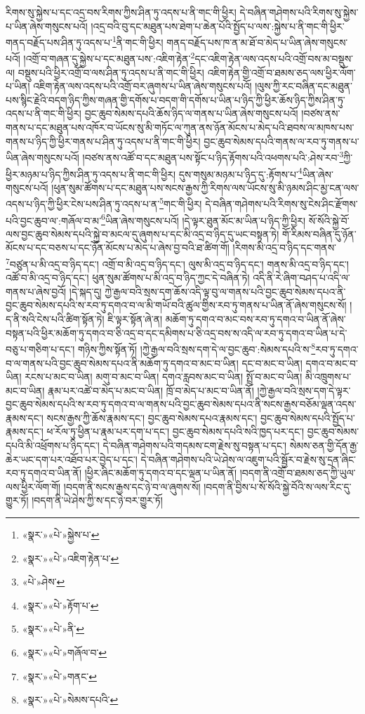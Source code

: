 རིགས་སུ་སྐྱེས་པ་དང་འདྲ་བས་རིགས་ཀྱིས་ཤིན་ཏུ་འདས་པ་ནི་གང་གི་ཕྱིར། དེ་བཞིན་གཤེགས་པའི་རིགས་སུ་སྐྱེས་པ་ཡིན་ཞེས་གསུངས་པའོ། །འདྲ་བའི་བུ་དང་མཐུན་པས་ཐེག་པ་ཆེན་པོའི་སྤྱོད་པ་ལས་:སྐྱེས་པ་ནི་གང་གི་ཕྱིར་གནད་བརྗོད་པས་ཤིན་ཏུ་འདས་པ་\footnote{«སྣར་»«པེ་»སྐྱེས་པ་}ནི་གང་གི་ཕྱིར། གནད་བརྗོད་པས་ཁ་ན་མ་ཐོ་བ་མེད་པ་ཡིན་ཞེས་གསུངས་པའོ། །འགྲོ་བ་གཞན་དུ་སྐྱེས་པ་དང་མཐུན་པས་:འཇིག་རྟེན་\footnote{«སྣར་»«པེ་»འཇིག་རྟེན་པ་}དང་འཇིག་རྟེན་ལས་འདས་པའི་འགྲོ་བས་མ་བསྡུས་ལ། བསྡུས་པའི་ཕྱིར་འགྲོ་བ་ལས་ཤིན་ཏུ་འདས་པ་ནི་གང་གི་ཕྱིར། འཇིག་རྟེན་གྱི་འགྲོ་བ་ཐམས་ཅད་ལས་ཕྱིར་ལོག་པ་ཡིན། འཇིག་རྟེན་ལས་འདས་པའི་འགྲོ་བར་ཞུགས་པ་ཡིན་ཞེས་གསུངས་པའོ། །ལུས་ཀྱི་རང་བཞིན་དང་མཐུན་པས་སྙིང་རྗེའི་བདག་ཉིད་ཀྱིས་གཞན་གྱི་དགོས་པ་བདག་གི་དགོས་པ་ཡིན་པ་ཉིད་ཀྱི་ཕྱིར་ཆོས་ཉིད་ཀྱིས་ཤིན་ཏུ་འདས་པ་ནི་གང་གི་ཕྱིར། བྱང་ཆུབ་སེམས་དཔའི་ཆོས་ཉིད་ལ་གནས་པ་ཡིན་ཞེས་གསུངས་པའོ། །བཙས་ནས་གནས་པ་དང་མཐུན་པས་འཁོར་བ་ཡོངས་སུ་མི་གཏོང་ལ་ཀུན་ནས་ཉོན་མོངས་པ་མེད་པའི་ཐབས་ལ་མཁས་པས་གནས་པ་ཉིད་ཀྱི་ཕྱིར་གནས་པ་ཤིན་ཏུ་འདས་པ་ནི་གང་གི་ཕྱིར། བྱང་ཆུབ་སེམས་དཔའི་གནས་ལ་རབ་ཏུ་གནས་པ་ཡིན་ཞེས་གསུངས་པའོ། །བཙས་ནས་འཚོ་བ་དང་མཐུན་པས་སྟོང་པ་ཉིད་རྟོགས་པའི་འཕགས་པའི་:ཤེས་རབ་\footnote{«པེ་»ཤེས་}ཀྱི་ཕྱིར་མཉམ་པ་ཉིད་ཀྱིས་ཤིན་ཏུ་འདས་པ་ནི་གང་གི་ཕྱིར། དུས་གསུམ་མཉམ་པ་ཉིད་དུ་:རྟོགས་པ་\footnote{«སྣར་»«པེ་»རྟོག་པ་}ཡིན་ཞེས་གསུངས་པའོ། །ཕུན་སུམ་ཚོགས་པ་དང་མཐུན་པས་སངས་རྒྱས་ཀྱི་རིགས་ལས་ཡོངས་སུ་མི་ཉམས་ཤིང་མྱ་ངན་ལས་འདས་པ་ཉིད་ཀྱི་ཕྱིར་ངེས་པས་ཤིན་ཏུ་འདས་པ་ན་\footnote{«སྣར་»«པེ་»ནི་}གང་གི་ཕྱིར། དེ་བཞིན་གཤེགས་པའི་རིགས་སུ་ངེས་ཤིང་རྫོགས་པའི་བྱང་ཆུབ་ལ་:གཞོལ་བ་མ་\footnote{«སྣར་»«པེ་»གཞོལ་བ་}ཡིན་ཞེས་གསུངས་པའོ། །དེ་ལྟར་ཐུན་མོང་མ་ཡིན་པ་ཉིད་ཀྱི་ཕྱིར། སོ་སོའི་སྐྱེ་བོ་ལས་བྱང་ཆུབ་སེམས་དཔའི་སྐྱེ་བ་མངལ་དུ་ཞུགས་པ་དང་མི་འདྲ་བ་ཉིད་དུ་ཡང་བསྟན་ཏེ། གོ་རིམས་བཞིན་དུ་ཉོན་མོངས་པ་དང་བཅས་པ་དང་ཉོན་མོངས་པ་མེད་པ་ཞེས་བྱ་བའི་ཐ་ཚིག་གོ། །རིགས་མི་འདྲ་བ་ཉིད་དང་གནས་\footnote{«སྣར་»«པེ་»གནང་}བཙུན་པ་མི་འདྲ་བ་ཉིད་དང་། འགྲོ་བ་མི་འདྲ་བ་ཉིད་དང་། ལུས་མི་འདྲ་བ་ཉིད་དང་། གནས་མི་འདྲ་བ་ཉིད་དང་། འཚོ་བ་མི་འདྲ་བ་ཉིད་དང་། ཕུན་སུམ་ཚོགས་པ་མི་འདྲ་བ་ཉིད་ཀྱང་དེ་བཞིན་ཏེ། འདི་ནི་རེ་ཞིག་བཤད་པ་འདི་ལ་གནས་པ་ཞེས་བྱའོ། །དེ་སྐད་དུ། ཀྱེ་རྒྱལ་བའི་སྲས་དག་ཆོས་འདི་ལྟ་བུ་ལ་གནས་པའི་བྱང་ཆུབ་སེམས་དཔའ་ནི་བྱང་ཆུབ་སེམས་དཔའི་ས་རབ་ཏུ་དགའ་བ་ལ་མི་གཡོ་བའི་ཚུལ་གྱིས་རབ་ཏུ་གནས་པ་ཡིན་ནོ་ཞེས་གསུངས་སོ། །ད་ནི་སའི་ངེས་པའི་ཚིག་སྟོན་ཏེ། ཇི་ལྟར་སྟོན་ཞེ་ན། མཆོག་ཏུ་དགའ་བ་མང་བས་རབ་ཏུ་དགའ་བ་ཡིན་ནོ་ཞེས་བསྟན་པའི་ཕྱིར་མཆོག་ཏུ་དགའ་བ་ཅི་འདྲ་བ་དང་དམིགས་པ་ཅི་འདྲ་བས་ས་འདི་ལ་རབ་ཏུ་དགའ་བ་ཡིན་པ་དེ་བཅུ་པ་གཅིག་པ་དང་། གཉིས་ཀྱིས་སྟོན་ཏོ། །ཀྱེ་རྒྱལ་བའི་སྲས་དག་དེ་ལ་བྱང་ཆུབ་:སེམས་དཔའི་ས་\footnote{«སྣར་»«པེ་»སེམས་དཔའི་}རབ་ཏུ་དགའ་བ་ལ་གནས་པའི་བྱང་ཆུབ་སེམས་དཔའ་ནི་མཆོག་ཏུ་དགའ་བ་མང་བ་ཡིན། དང་བ་མང་བ་ཡིན། དགའ་བ་མང་བ་ཡིན། རངས་པ་མང་བ་ཡིན། མགུ་བ་མང་བ་ཡིན། དགའ་རླབས་མང་བ་ཡིན། སྤྲོ་བ་མང་བ་ཡིན། མི་འཁྲུགས་པ་མང་བ་ཡིན། རྣམ་པར་འཚེ་བ་མེད་པ་མང་བ་ཡིན། ཁྲོ་བ་མེད་པ་མང་བ་ཡིན་ནོ། །ཀྱེ་རྒྱལ་བའི་སྲས་དག་དེ་ལྟར་བྱང་ཆུབ་སེམས་དཔའི་ས་རབ་ཏུ་དགའ་བ་ལ་གནས་པའི་བྱང་ཆུབ་སེམས་དཔའ་ནི་སངས་རྒྱས་བཅོམ་ལྡན་འདས་རྣམས་དང་། སངས་རྒྱས་ཀྱི་ཆོས་རྣམས་དང་། བྱང་ཆུབ་སེམས་དཔའ་རྣམས་དང་། བྱང་ཆུབ་སེམས་དཔའི་སྤྱོད་པ་རྣམས་དང་། ཕ་རོལ་ཏུ་ཕྱིན་པ་རྣམ་པར་དག་པ་དང་། བྱང་ཆུབ་སེམས་དཔའི་སའི་ཁྱད་པར་དང་། བྱང་ཆུབ་སེམས་དཔའི་མི་འཕྲོགས་པ་ཉིད་དང་། དེ་བཞིན་གཤེགས་པའི་གདམས་ངག་རྗེས་སུ་བསྟན་པ་དང་། སེམས་ཅན་གྱི་དོན་རྒྱ་ཆེར་ཡང་དག་པར་འཐོབ་པར་བྱེད་པ་དང་། དེ་བཞིན་གཤེགས་པའི་ཡེ་ཤེས་ལ་འཇུག་པའི་སྦྱོར་བ་རྗེས་སུ་དྲན་ཞིང་རབ་ཏུ་དགའ་བ་ཡིན་ནོ། །ཕྱིར་ཞིང་མཆོག་ཏུ་དགའ་བ་དང་ལྡན་པ་ཡིན་ནོ། །བདག་ནི་འགྲོ་བ་ཐམས་ཅད་ཀྱི་ཡུལ་ལས་ཕྱིར་ལོག་གོ། །བདག་ནི་སངས་རྒྱས་དང་ཉེ་བ་ལ་ཞུགས་སོ། །བདག་ནི་བྱིས་པ་སོ་སོའི་སྐྱེ་བོའི་ས་ལས་རིང་དུ་གྱུར་ཏོ། །བདག་ནི་ཡེ་ཤེས་ཀྱི་ས་དང་ཉེ་བར་གྱུར་ཏོ། 